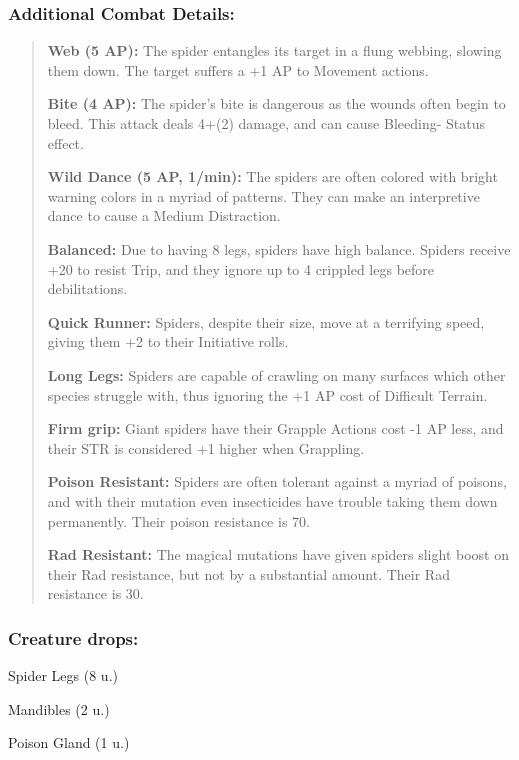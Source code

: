 \documentclass[11pt,a4paper,twocolumn]{book}
\begin{document}
	\subsubsection*{Additional Combat Details:}
	\begin{verse}
		\textbf{Web (5 AP):} The spider entangles its target in a flung webbing, slowing them down. The target suffers a +1 AP to Movement actions.
		
		\textbf{Bite (4 AP):} The spider's bite is dangerous as the wounds often begin to bleed. This attack deals 4+(2) damage, and can cause Bleeding- Status effect.
		
		\textbf{Wild Dance (5 AP, 1/min):} The spiders are often colored with bright warning colors in a myriad of patterns. They can make an interpretive dance to cause a Medium Distraction.
		
		\textbf{Balanced:} Due to having 8 legs, spiders have high balance. Spiders receive +20 to resist Trip, and they ignore up to 4 crippled legs before debilitations.
		
		\textbf{Quick Runner:} Spiders, despite their size, move at a terrifying speed, giving them +2 to their Initiative rolls.
		
		\textbf{Long Legs:} Spiders are capable of crawling on many surfaces which other species struggle with, thus ignoring the +1 AP cost of Difficult Terrain.
		
		\textbf{Firm grip:} Giant spiders have their Grapple Actions cost -1 AP less, and their STR is considered +1 higher when Grappling.
		
		\textbf{Poison Resistant:} Spiders are often tolerant against a myriad of poisons, and with their mutation even insecticides have trouble taking them down permanently. Their poison resistance is 70.
		
		\textbf{Rad Resistant:} The magical mutations have given spiders slight boost on their Rad resistance, but not by a substantial amount. Their Rad resistance is 30.
	\end{verse}
	
	\subsubsection*{Creature drops:}
	\begin{compactitem}
		\item Spider Legs (8 u.)
		\item Mandibles (2 u.)
		\item Poison Gland (1 u.)
	\end{compactitem}
	
\end{document}
